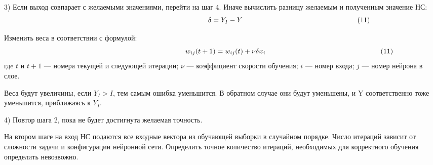 \documentclass[a4paper,english,russian]{G2-105}
\begin{document}
\par 3) Если выход совпарает с желаемыми значениями, перейти на шаг 4.
Иначе вычислить разницу желаемым и полученным значение НС:
\[
\ \hspace*{66mm} \delta=Y_I-Y \ \hspace*{56mm} (11)
\] 
\par Изменить веса в соответствии с формулой:
\[
\ \hspace*{66mm} w_{ij}(t+1)=w_{ij}(t)+\nu        \delta x_i \ \hspace*{56mm} (11)
\]
гдe $t$ и $t+1$ --- номера текущей и следующей итерации; $\nu$ --- коэффициент скорости обучения; $i$ --- номер входа; $j$ --- номер нейрона в слое.
\par Веса будут увеличины, если $Y_I>I$, тем самым ошибка уменьшится. В обратном случае они будут уменьшены, и Y соответственно тоже уменьшится, приближаясь к $Y_I$.
\par 4) Повтор шага 2, пока не будет достигнута желаемая точность.
\par На втором шаге на вход НС подаются все входные вектора из обучающей выборки в случайном порядке. Число итераций зависит от сложности задачи и конфигурации нейронной сети. Определить точное количество итераций, необходимых для корректного обучения определить невозвожно. 
\ttl
\end{document}
